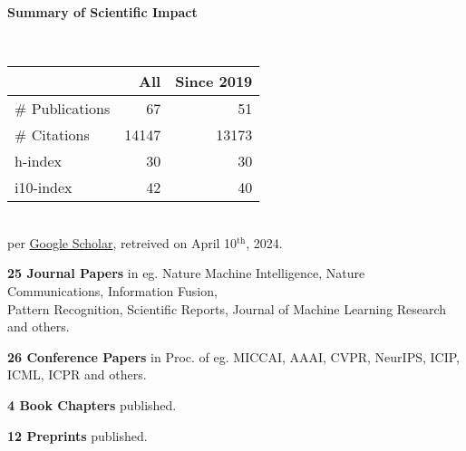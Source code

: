\headedsection %
{\bf Summary of Scientific Impact}{}{}
{
    \qquad~~~~
    \begin{minipage}[t]{0.6\textwidth}
        \begin{tabular}{lrr}
        \hline
         & All & Since 2019\\
        \hline
        \# Publications & 67     & 51    \\
        \# Citations    & 14147  & 13173 \\
        h-index         & 30     & 30    \\
        i10-index       & 42     & 40    \\
        \hline
    \end{tabular}
    \\
    {\footnotesize{
        per \href{https://scholar.google.com/citations?user=wpLQuroAAAAJ}{Google Scholar},
        retreived on April 10$^\text{th}$, 2024.
        }
    }
    \end{minipage}

    \ifdefined\shortcv
        \vstep
        {\bf 25 Journal Papers} in eg. Nature Machine Intelligence, Nature Communications, Information Fusion,\\
        \hspace*{\fill} Pattern Recognition, Scientific Reports, Journal of Machine Learning Research and others.

        {\bf 26 Conference Papers} in Proc. of eg. MICCAI, AAAI, CVPR, NeurIPS, ICIP, ICML, ICPR and others.

        {\bf 4 Book Chapters} published.

        {\bf 12 Preprints} published.
        
    \else
        {}
    \fi

}
